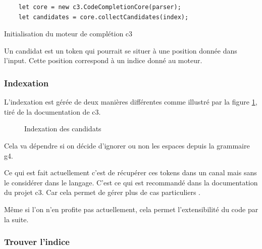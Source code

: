 \documentclass[
    iict, %
    il, %
]{heig-tb}
\begin{document}
\begin{listing}[!ht]
    \begin{verbatim}
    let core = new c3.CodeCompletionCore(parser);
    let candidates = core.collectCandidates(index);
    \end{verbatim}
    \caption{Initialisation du moteur de complétion c3}
    \label{c3-setup}
\end{listing}

Un candidat est un token qui pourrait se situer à une position donnée dans l'input.
Cette position correspond à un indice donné au moteur.

\subsubsection{Indexation}
L'indexation est gérée de deux manières différentes comme illustré par la figure \ref{candidat-index}, tiré de la documentation de c3.

\begin{figure}[!h]
    \begin{center}
    \end{center}
    \caption[Indexation des candidats]{\label{candidat-index} Indexation des candidats}
\end{figure}

Cela va dépendre si on décide d'ignorer ou non les espaces depuis la grammaire g4.

Ce qui est fait actuellement c'est de récupérer ces tokens dans un canal mais sans le considérer dans le langage.
C'est ce qui est recommandé dans la documentation du projet c3. Car cela permet de gérer plus de cas particuliers \cite{c3-example-soql}.

Même si l'on n'en profite pas actuellement, cela permet l'extensibilité du code par la suite. %


\subsubsection{Trouver l'indice}
\end{document}
